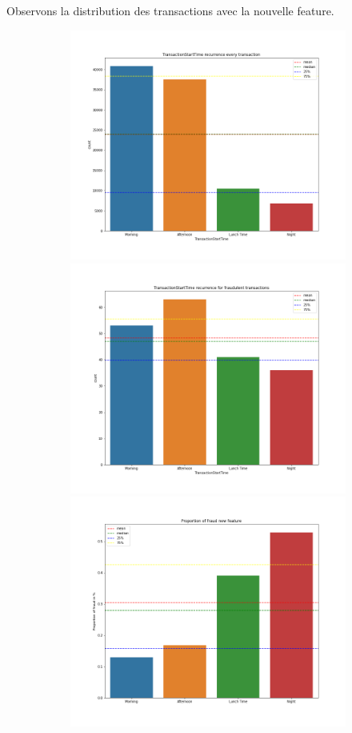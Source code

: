 \documentclass{article}
\begin{document}
Observons la distribution des transactions avec la nouvelle feature.\\

\begin{figure}[h]
    \begin{subfigure}{\linewidth}
        \centering
        \includegraphics[width=.3\linewidth]{./images/TransactionStartTime_recurrence_every_transaction_new_feature.png}\hfill
        
        \includegraphics[width=.3\linewidth]{./images/TransactionStartTime_recurrence_fraud_new_feature.png}\hfill
        
        \includegraphics[width=.3\linewidth]{./images/TransactionStartTime_proportion_fraud_new_feature.png}

    \centering
    \end{subfigure}
    

\end{figure}
\end{document}
